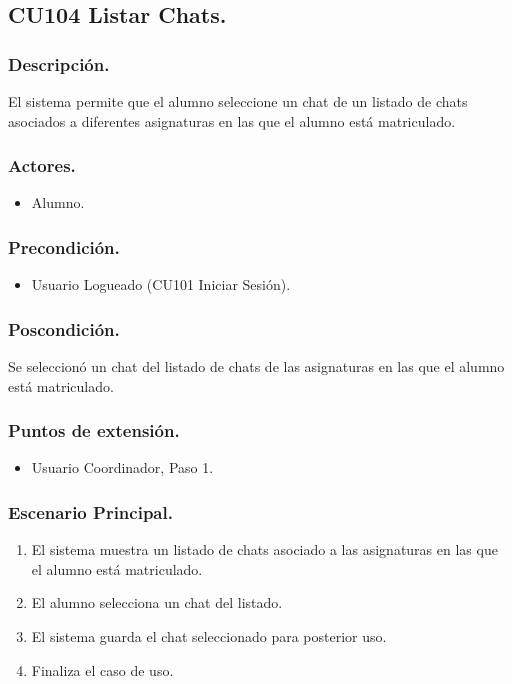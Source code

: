 \subsection{CU104 Listar Chats.}
\subsubsection{Descripci\'{o}n.}
El sistema permite que el alumno seleccione un chat de un listado de chats asociados a diferentes asignaturas en las que el alumno est\'{a} matriculado.
\subsubsection{Actores.}
\begin{itemize}
\item Alumno.
\end{itemize}
\subsubsection{Precondici\'{o}n.}
\begin{itemize}
\item Usuario Logueado (CU101 Iniciar Sesi\'{o}n).
\end{itemize}
\subsubsection{Poscondici\'{o}n.}
Se seleccion\'{o} un chat del listado de chats de las asignaturas en las que el alumno est\'{a} matriculado.
\subsubsection{Puntos de extensi\'{o}n.}
\begin{itemize}
\item Usuario Coordinador, Paso 1.
\end{itemize}
\subsubsection{Escenario Principal.}
\begin{enumerate}
\item El sistema muestra un listado de chats asociado a las asignaturas en las que el alumno est\'{a} matriculado.
\item El alumno selecciona un chat del listado.
\item El sistema guarda el chat seleccionado para posterior uso.
\item Finaliza el caso de uso.
\end{enumerate}

